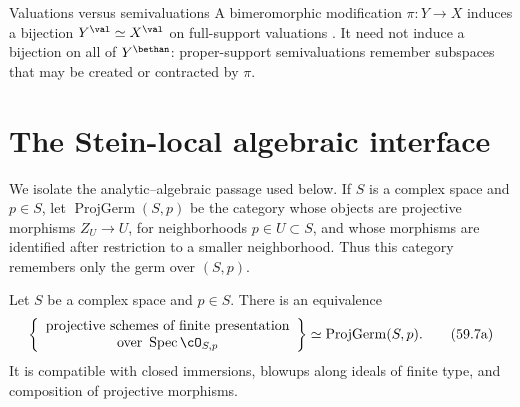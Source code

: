 \begin{warning}{Valuations versus semivaluations}
\label{warn:mp-valuations-semivaluations}
A bimeromorphic modification $\pi:Y\to X$ induces a bijection
$Y^{\val}\simeq X^{\val}$ on full-support valuations
\cite[Proposition~2.1.6]{MPTropicalV2}.  It need not induce a bijection on all of
$Y^{\bethan}$: proper-support semivaluations remember subspaces that may be
created or contracted by $\pi$.
\end{warning}

\section{The Stein-local algebraic interface}
\label{sec:mp-dual-stein}

We isolate the analytic--algebraic passage used below.  If $S$ is a complex
space and $p\in S$, let $\operatorname{ProjGerm}(S,p)$ be the category
whose objects are projective morphisms $Z_U\to U$, for neighborhoods
$p\in U\subset S$, and whose morphisms are identified after restriction to
a smaller neighborhood.  Thus this category remembers only the germ over
$(S,p)$.

\begin{theorem}\label{thm:mp-bingener-projective-germs}
Let $S$ be a complex space and $p\in S$.  There is an equivalence
\[
 \left\{
 \begin{array}{c}
   \text{projective schemes of finite presentation}\cr
   \text{over }\operatorname{Spec}\cO_{S,p}
 \end{array}
 \right\}
 \simeq \operatorname{ProjGerm}(S,p).
\tag{59.7a}\label{eq:mp-projective-germ-equivalence}
\]
It is compatible with closed immersions, blowups along ideals of finite
type, and composition of projective morphisms.
\end{theorem}


